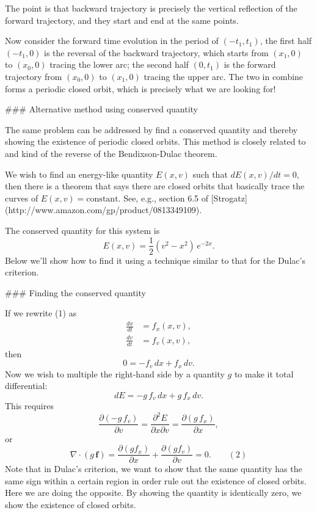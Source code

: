 The point is that backward trajectory is precisely the vertical reflection of the forward trajectory, and they start and end at the same points.

Now consider the forward time evolution in the period of $(-t_1, t_1)$, the first half $(-t_1, 0)$ is the reversal of the backward trajectory, which starts from $(x_1, 0)$ to $(x_0, 0)$ tracing the lower arc; the second half $(0, t_1)$ is the forward trajectory from $(x_0, 0)$ to $(x_1, 0)$ tracing the upper arc.  The two in combine forms a periodic closed orbit, which is precisely what we are looking for!


### Alternative method using conserved quantity


The same problem can be addressed by find a conserved quantity and thereby showing the existence of periodic closed orbits.  This method is closely related to and kind of the reverse of the Bendixson-Dulac theorem.

We wish to find an energy-like quantity $E(x, v)$ such  that $dE(x, v)/dt = 0$, then there is a theorem that says there are closed orbits that basically trace the curves of $E(x, v) = \mathrm{constant}$.  See, e.g., section 6.5 of [Strogatz](http://www.amazon.com/gp/product/0813349109).

The conserved quantity for this system is
$$
E(x, v) = \frac{1}{2} (v^2 - x^2) \, e^{-2x}.
$$
Below we'll show how to find it using a technique similar to that for the Dulac's criterion.

### Finding the conserved quantity

If we rewrite (1) as
$$
\begin{aligned}
\frac{dx}{dt} &= f_x(x, v), \\
\frac{dv}{dt} &= f_v(x, v),
\end{aligned}
$$
then
$$
0 = -f_v \, dx + f_x \, dv.
$$
Now we wish to multiple the right-hand side by a quantity $g$
to make it total differential:
$$
dE = -g \, f_v \, dx + g \, f_x \, dv.
$$
This requires
$$
\frac{\partial (-g \, f_v)}{\partial v}
=
\frac{\partial^2 E}{\partial x \partial v}
=
\frac{\partial (g \, f_x)}{\partial x},
$$
or
$$
\nabla \cdot (g \, \mathbf f)
=
\frac{\partial (g f_x)}{\partial x}
+\frac{\partial (g f_v)}{\partial v}
= 0.
\quad \quad (2)
$$
Note that in Dulac's criterion, we want to show that the same quantity has the same sign within a certain region in order rule out the existence of closed orbits.  Here we are doing the opposite.  By showing the quantity is identically zero, we show the existence of closed orbits.


